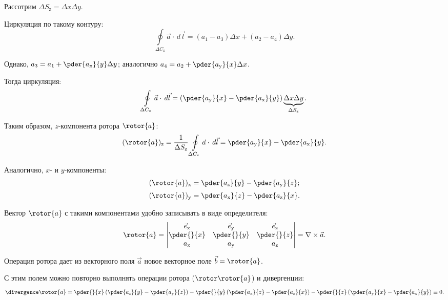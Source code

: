 	Рассотрим \( \Delta S_\mathrm{z} = \Delta x\Delta y \).
	
	Циркуляция по такому контуру:
	\[ \oint\limits_{\Delta C_\mathrm{z}} \vec{a}\cdot\,d\vec{l} = (a_1 - a_3)\Delta x + (a_2 - a_4)\Delta y. \]
	
	\begin{comment}
	Работа на сторонах 3 и 4 идет со знаками “\( - \)”, так как на них \( \Delta x\Delta y < 0 \).
	\end{comment}
	
	Однако, \( a_3 = a_1 + \pder{a_\mathrm{x}}{y}\Delta y \); аналогично \( a_4 = a_2 + \pder{a_\mathrm{y}}{x}\Delta x \).
	
	Тогда циркуляция:
	\[ \oint\limits_{\Delta C_\mathrm{z}} \vec{a}\cdot\,d\vec{l} = \left(\pder{a_\mathrm{y}}{x} - \pder{a_\mathrm{x}}{y}\right) \underbrace{\Delta x\Delta y}_{\Delta S_\mathrm{z}}. \]
	
	Таким образом, \( z \)-компонента ротора \( \rotor{a} \):
	\[ (\rotor{a})_\mathrm{z} = \frac{1}{\Delta S_\mathrm{z}}\oint\limits_{\Delta C_\mathrm{z}} \vec{a}\cdot\,d\vec{l} = \pder{a_\mathrm{y}}{x} - \pder{a_\mathrm{x}}{y}. \]
	
	Аналогично, \( x \)- и \( y \)-компоненты:
	\[ \begin{array}{l}
		(\rotor{a})_\mathrm{x} = \pder{a_\mathrm{z}}{y} - \pder{a_\mathrm{y}}{z}; \\[0.2cm]
		(\rotor{a})_\mathrm{y} = \pder{a_\mathrm{x}}{z} - \pder{a_\mathrm{z}}{x}.
	\end{array} \]
	
	Вектор \( \rotor{a} \) с такими компонентами удобно записывать в виде определителя:
	\begin{equation} \rotor{a} = \begin{vmatrix}
	\vec{e}_\mathrm{x} & \vec{e}_\mathrm{y} & \vec{e}_\mathrm{z} \\
	\pder{}{x} & \pder{}{y} & \pder{}{z} \\
	a_\mathrm{x} & a_\mathrm{y} & a_\mathrm{z}
	\end{vmatrix} = \nabla\times\vec{a}. \label{eq5:3} \end{equation}
	
	Операция ротора дает из векторного поля \( \vec{a} \) новое векторное поле \( \vec{b} = \rotor{a} \).
	
	С этим полем можно повторно выполнять операции ротора (\( \rotor\rotor{a} \)) и дивергенции:
	\[ \divergence\rotor{a} =
	\pder{}{x}\left(\pder{a_\mathrm{z}}{y} - \pder{a_\mathrm{y}}{z}\right) -
	\pder{}{y}\left(\pder{a_\mathrm{x}}{z} - \pder{a_\mathrm{z}}{x}\right) -
	\pder{}{z}\left(\pder{a_\mathrm{y}}{x} - \pder{a_\mathrm{x}}{y}\right)
	\equiv 0. \]
	
